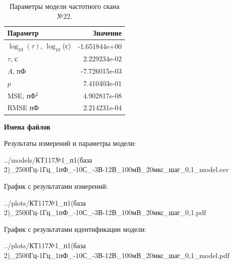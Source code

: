 \begin{table}[!ht]
    \centering
    \caption{Параметры модели частотного скана №22.}
    \begin{tabular}{|l|r|}
        \hline
        Параметр                                       & Значение                  \\ \hline
        $\log_{10}(\tau)$, $\log_{10}$(с)              & -1.651844e+00             \\ \hline
        $\tau$, с                                      & 2.229234e-02              \\ \hline
        $A$, пФ                                        & -7.726015e-03             \\ \hline
        $p$                                            & 7.410403e-01              \\ \hline
        MSE, пФ$^2$                                    & 4.902817e-08              \\ \hline
        RMSE пФ                                        & 2.214231e-04              \\ \hline
    \end{tabular}
    \label{table:frequency_scan_model_22}
\end{table}

\textbf{Имена файлов}

Результаты измерений и параметры модели:

\scriptsize../models/КТ117№1\_п1(база 2)\_2500Гц-1Гц\_1пФ\_-10С\_-3В-12В\_100мВ\_20мкс\_шаг\_0,1\_model.csv
\normalsize

График с результатами измерений:

\scriptsize../plots/КТ117№1\_п1(база 2)\_2500Гц-1Гц\_1пФ\_-10С\_-3В-12В\_100мВ\_20мкс\_шаг\_0,1.pdf
\normalsize

График с результатами идентификации модели:

\scriptsize../plots/КТ117№1\_п1(база 2)\_2500Гц-1Гц\_1пФ\_-10С\_-3В-12В\_100мВ\_20мкс\_шаг\_0,1\_model.pdf
\normalsize

